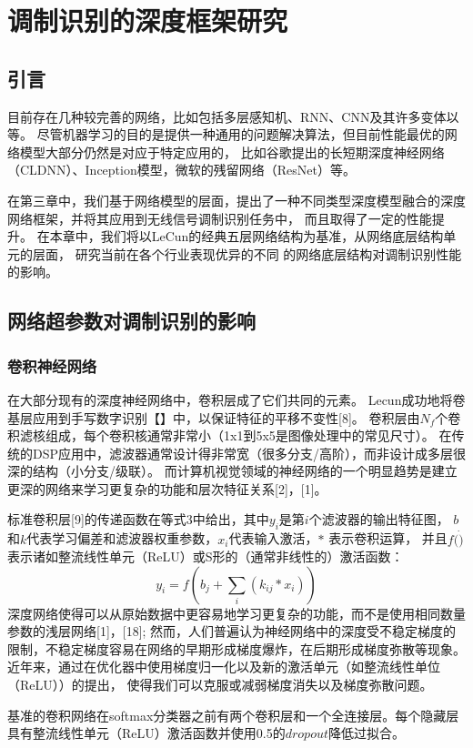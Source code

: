 \chapter{调制识别的深度框架研究}

\section{引言}
目前存在几种较完善的网络，比如包括多层感知机、RNN、CNN及其许多变体以等。
尽管机器学习的目的是提供一种通用的问题解决算法，但目前性能最优的网络模型大部分仍然是对应于特定应用的，
比如谷歌提出的长短期深度神经网络（CLDNN）、Inception模型，微软的残留网络（ResNet）等。 \par
在第三章中，我们基于网络模型的层面，提出了一种不同类型深度模型融合的深度网络框架，并将其应用到无线信号调制识别任务中，
而且取得了一定的性能提升。
在本章中，我们将以LeCun的经典五层网络结构为基准，从网络底层结构单元的层面，
研究当前在各个行业表现优异的不同
的网络底层结构对调制识别性能的影响。\par

\section{网络超参数对调制识别的影响}

\subsection{卷积神经网络}
在大部分现有的深度神经网络中，卷积层成了它们共同的元素。
Lecun成功地将卷基层应用到手写数字识别【】中，以保证特征的平移不变性[8]。
卷积层由$N_f$个卷积滤核组成，每个卷积核通常非常小（1x1到5x5是图像处理中的常见尺寸）。
在传统的DSP应用中，滤波器通常设计得非常宽（很多分支/高阶），而非设计成多层很深的结构（小分支/级联）。
而计算机视觉领域的神经网络的一个明显趋势是建立更深的网络来学习更复杂的功能和层次特征关系[2]，[1]。\par
标准卷积层[9]的传递函数在等式3中给出，其中$y_i$是第$i$个滤波器的输出特征图，
$b$和$k$代表学习偏差和滤波器权重参数，$x_i$代表输入激活，$*$ 表示卷积运算，
并且$f(\dot)$表示诸如整流线性单元（ReLU）或S形的（通常非线性的）激活函数：
\begin{equation}
	y_i = f (b_j + \sum_{i}(k_{ij} * x_i))
\end{equation}
深度网络使得可以从原始数据中更容易地学习更复杂的功能，而不是使用相同数量参数的浅层网络[1]，[18];
然而，人们普遍认为神经网络中的深度受不稳定梯度的限制，不稳定梯度容易在网络的早期形成梯度爆炸，在后期形成梯度弥散等现象。
近年来，通过在优化器中使用梯度归一化以及新的激活单元（如整流线性单位（ReLU））的提出，
使得我们可以克服或减弱梯度消失以及梯度弥散问题。\par
基准的卷积网络在softmax分类器之前有两个卷积层和一个全连接层。每个隐藏层具有整流线性单元（ReLU）激活函数并使用0.5的$dropout$降低过拟合。\par

